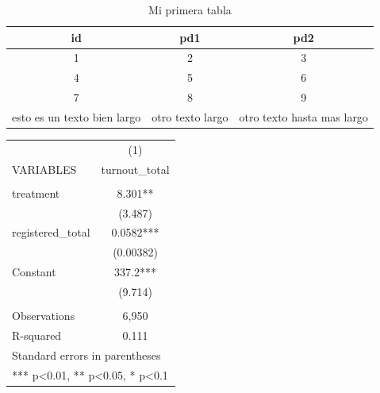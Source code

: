 \documentclass{article}
\begin{document}
\begin{table}[H]
    \centering
    \begin{tabular}{|c|c|c|} %
    \toprule
        \textbf{id} & \textbf{pd1} & \textbf{pd2}\\
    \midrule
        1 & 2 & 3\\
        4 & 5 & 6\\
        7 & 8 & 9 \\
        \midrule
        esto es un texto bien largo &
        otro texto largo &
        otro texto hasta mas largo \\
    \bottomrule
    \end{tabular}
    \caption{Mi primera tabla}
    \label{tab:my_label}
\end{table}

\begin{table}[H]
\centering
\begin{tabular}{lc}
                                          & (1)                                    \\
VARIABLES                                 & turnout\_total                         \\
                                          &                                        \\
treatment                                 & 8.301**                                \\
                                          & (3.487)                                \\
registered\_total                         & 0.0582***                              \\
                                          & (0.00382)                              \\
Constant                                  & 337.2***                               \\
                                          & (9.714)                                \\
                                          &                                        \\
Observations                              & 6,950                                  \\
R-squared                                 & 0.111                                  \\
\multicolumn{2}{l}{Standard   errors in parentheses}                               \\
\multicolumn{2}{l}{***   p\textless{}0.01, ** p\textless{}0.05, * p\textless{}0.1}
\end{tabular}
\end{table}
\end{document}

